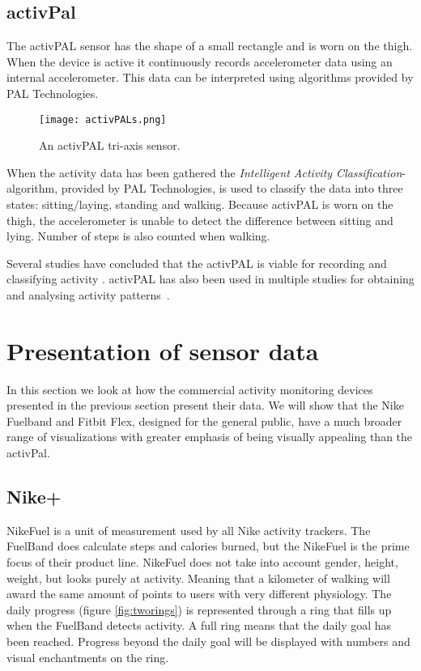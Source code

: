 \subsection{activPal}
\label{sensorActivPal}
The activPAL sensor has the shape of a small rectangle and is worn on the thigh. When the device is active it continuously records accelerometer data using an internal accelerometer. This data can be interpreted using algorithms provided by PAL Technologies.

\begin{figure}[h!]
	\centering
		\texttt{[image: activPALs.png]}
		\caption{\footnotesize An activPAL tri-axis sensor.}
		\label{fig:activPal}
\end{figure}

When the activity data has been gathered the \emph{Intelligent Activity Classification}-algorithm, provided by PAL Technologies, is used to classify the data into three states: sitting/laying, standing and walking. Because activPAL is worn on the thigh, the accelerometer is unable to detect the difference between sitting and lying. Number of steps is also counted when walking.

Several studies have concluded that the activPAL is viable for recording and classifying activity \cite{grant2006, ryan2006, grant2008, tsavourelou}. activPAL has also been used in multiple studies for obtaining and analysing activity patterns~\cite{grant2010, lord, ryan2010}.

\section{Presentation of sensor data}
In this section we look at how the commercial activity monitoring devices presented in the previous section present their data. We will show that the Nike Fuelband and Fitbit Flex, designed for the general public, have a much broader range of visualizations with greater emphasis of being visually appealing than the activPal.

\subsection{Nike+}
NikeFuel \cite{nikefuel} is a unit of measurement used by all Nike activity trackers. The FuelBand does calculate steps and calories burned, but the NikeFuel is the prime focus of their product line. NikeFuel does not take into account gender, height, weight, but looks purely at activity. Meaning that a kilometer of walking will award the same amount of points to users with very different physiology. The daily progress (figure \ref{fig:tworings}) is represented through a ring that fills up when the FuelBand detects activity. A full ring means that the daily goal has been reached. Progress beyond the daily goal will be displayed with numbers and visual enchantments on the ring. 

